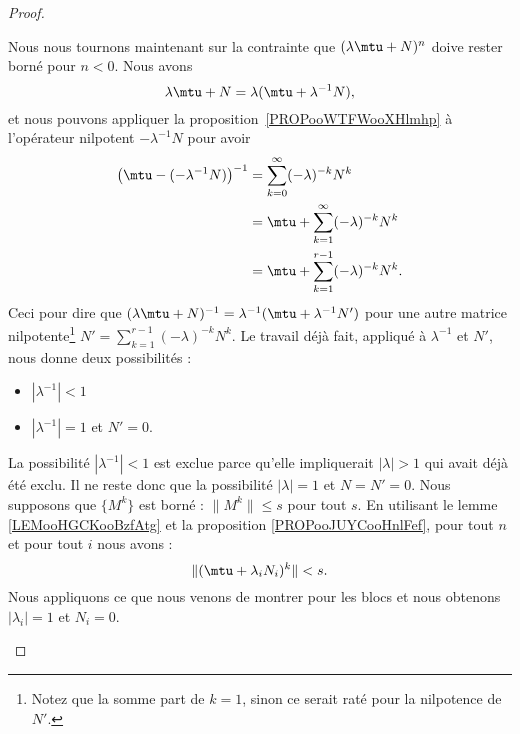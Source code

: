 \begin{proof}
\begin{subproof}
		Nous nous tournons maintenant sur la contrainte que \( (\lambda\mtu+N)^n\) doive rester borné pour \( n<0\). Nous avons
		\begin{equation}
			\lambda\mtu+N=\lambda(\mtu+\lambda^{-1}N),
		\end{equation}
		et nous pouvons appliquer la proposition~\ref{PROPooWTFWooXHlmhp} à l'opérateur nilpotent \( -\lambda^{-1} N\) pour avoir
		\begin{subequations}
			\begin{align}
				\big( \mtu-(-\lambda^{-1}N) \big)^{-1} & =\sum_{k=0}^{\infty}(-\lambda)^{-k}N^k      \\
				                                       & =\mtu+\sum_{k=1}^{\infty}(-\lambda)^{-k}N^k \\
				                                       & =\mtu+\sum_{k=1}^{r-1}(-\lambda)^{-k}N^k.
			\end{align}
		\end{subequations}
		Ceci pour dire que \( (\lambda\mtu+N)^{-1}=\lambda^{-1}(\mtu+\lambda^{-1}N')\) pour une autre matrice nilpotente\footnote{Notez que la somme part de \( k=1\), sinon ce serait raté pour la nilpotence de \( N'\).} \( N'=\sum_{k=1}^{r-1}(-\lambda)^{-k}N^k\). Le travail déjà fait, appliqué à \( \lambda^{-1}\) et \( N'\), nous donne deux possibilités :
		\begin{itemize}
			\item \( | \lambda^{-1} |<1\)
			\item \( | \lambda^{-1} |=1\) et \( N'=0\).
		\end{itemize}
		La possibilité \( | \lambda^{-1} |<1\) est exclue parce qu'elle impliquerait \( | \lambda |>1\) qui avait déjà été exclu. Il ne reste donc que la possibilité \( | \lambda |=1\) et \( N=N'=0\).
		Nous supposons que \( \{ M^k \}\) est borné : \( \| M^k \|\leq s\) pour tout \( s\). En utilisant le lemme \ref{LEMooHGCKooBzfAtg} et la proposition \ref{PROPooJUYCooHnlFef}, pour tout \( n\) et pour tout \( i\) nous avons :
		\begin{equation}
			\| (\mtu+\lambda_iN_i)^k \|<s.
		\end{equation}
		Nous appliquons ce que nous venons de montrer pour les blocs et nous obtenons \( | \lambda_i |=1\) et \( N_i=0\).


\end{subproof}
\end{proof}
